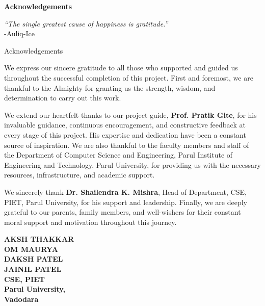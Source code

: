\thispagestyle{empty}
\newpage
\cleardoublepage{}
{}
\begin{center}
{\Large \bf Acknowledgements}\\
\end{center}
\vspace{10pt}
\begin{flushright}
\textit{“The single greatest cause of happiness is gratitude.” }\\
\vspace{5mm}
-Auliq-Ice
\end{flushright}
\hspace{10mm}Acknowledgements

We express our sincere gratitude to all those who supported and guided us throughout the successful completion of this project. First and foremost, we are thankful to the Almighty for granting us the strength, wisdom, and determination to carry out this work.

We extend our heartfelt thanks to our project guide, \textbf{Prof. Pratik Gite}, for his invaluable guidance, continuous encouragement, and constructive feedback at every stage of this project. His expertise and dedication have been a constant source of inspiration. We are also thankful to the faculty members and staff of the Department of Computer Science and Engineering, Parul Institute of Engineering and Technology, Parul University, for providing us with the necessary resources, infrastructure, and academic support.

We sincerely thank \textbf{Dr. Shailendra K. Mishra}, Head of Department, CSE, PIET, Parul University, for his support and leadership. Finally, we are deeply grateful to our parents, family members, and well-wishers for their constant moral support and motivation throughout this journey.

\vspace{1.5cm}
\begin{flushright}
\textbf{AKSH THAKKAR \\ OM MAURYA \\ DAKSH PATEL \\ JAINIL PATEL \\ CSE, PIET\\ Parul University, \\Vadodara}\\ 
\end{flushright}